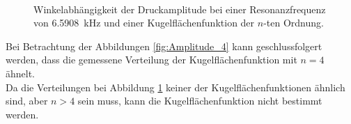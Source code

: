 \begin{figure}
    \\
    \caption{Winkelabhängigkeit der Druckamplitude bei einer Resonanzfrequenz von \SI{6.5908}{\kilo\hertz} und einer Kugelflächenfunktion der $n$-ten Ordnung.}
    \label{fig:Amplitude_6}
\end{figure}
\FloatBarrier
Bei Betrachtung der Abbildungen \ref{fig:Amplitude_4} kann geschlussfolgert werden, 
dass die gemessene Verteilung der Kugelflächenfunktion mit $n=4$ ähnelt. \\
Da die Verteilungen bei Abbildung \ref{fig:Amplitude_6} keiner der Kugelflächenfunktionen ähnlich sind, aber
$n>4$ sein muss, kann die Kugelflächenfunktion nicht bestimmt werden.

